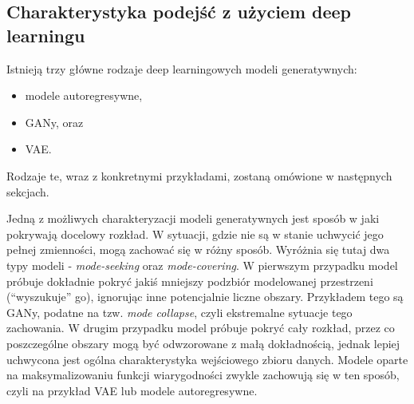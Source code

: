 \documentclass[magisterska]{pracamgr}
\renewcommand{\cite}{\citep}
\begin{document}
\subsection{Charakterystyka podejść z użyciem deep learningu}

Istnieją trzy główne rodzaje deep learningowych modeli generatywnych:
\begin{itemize}
    \setlength\itemsep{0em}
    \item modele autoregresywne,
    \item GANy, oraz
    \item VAE.
\end{itemize}
Rodzaje te, wraz z konkretnymi przykładami, zostaną omówione w następnych sekcjach.


Jedną z możliwych charakteryzacji modeli generatywnych jest sposób w jaki pokrywają docelowy rozkład. W sytuacji, gdzie nie są w stanie uchwycić jego pełnej zmienności, mogą zachować się w różny sposób. Wyróżnia się tutaj dwa typy modeli - \emph{mode-seeking} oraz \emph{mode-covering}. W pierwszym przypadku model próbuje dokładnie pokryć jakiś mniejszy podzbiór modelowanej przestrzeni ("`wyszukuje"' go), ignorując inne potencjalnie liczne obszary. Przykładem tego są GANy, podatne na tzw. \emph{mode collapse}, czyli ekstremalne sytuacje tego zachowania. W drugim przypadku model próbuje pokryć cały rozkład, przez co poszczególne obszary mogą być odwzorowane z małą dokładnością, jednak lepiej uchwycona jest ogólna charakterystyka wejściowego zbioru danych. Modele oparte na maksymalizowaniu funkcji wiarygodności zwykle zachowują się w ten sposób, czyli na przykład VAE lub modele autoregresywne.
\end{document}
